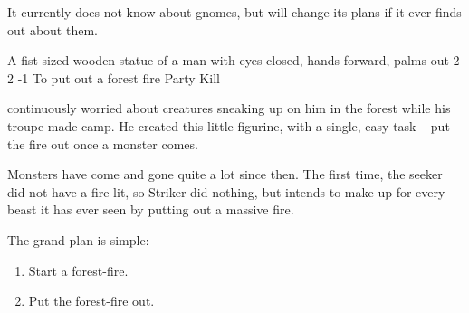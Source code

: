 \begin{multicols}{2}
It currently does not know about gnomes, but will change its plans if it ever finds out about them.

\showStdSpells

  {A fist-sized wooden statue of a man with eyes closed, hands forward, palms out}%
  {2}%
  {2}%
  {-1}%
  {To put out a forest fire}%
  {Party Kill}%
  {
    \setcounter{Fire}{3}
    \setcounter{Survival}{1}
  }%

 continuously worried about creatures sneaking up on him in the forest while his troupe made camp.
He created this little figurine, with a single, easy task -- put the fire out once a monster comes.

Monsters have come and gone quite a lot since then.
The first time, the \gls{seeker} did not have a fire lit, so Striker did nothing, but intends to make up for every beast it has ever seen by putting out a massive fire.

The grand plan is simple:

\begin{enumerate}
  \item
  Start a forest-fire.
  \item
  Put the forest-fire out.
\end{enumerate}

\showStdSpells

\end{multicols}
